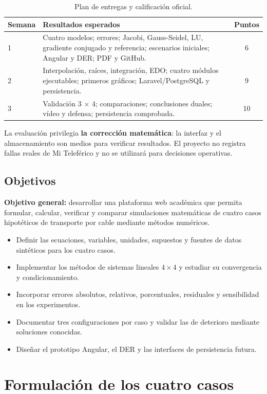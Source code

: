 \documentclass[letterpaper,11pt]{article}
\begin{document}
\begin{table}[H]\centering\small
\caption{Plan de entregas y calificación oficial.}\label{tab:cronograma}
\begin{tabularx}{\linewidth}{@{}lXc@{}}\toprule
\textbf{Semana} & \textbf{Resultados esperados} & \textbf{Puntos}\\\midrule
1 & Cuatro modelos; errores; Jacobi, Gauss-Seidel, LU, gradiente conjugado y referencia; escenarios iniciales; Angular y DER; PDF y GitHub. & 6\\
2 & Interpolación, raíces, integración, EDO; cuatro módulos ejecutables; primeros gráficos; Laravel/PostgreSQL y persistencia. & 9\\
3 & Validación 3 $\times$ 4; comparaciones; conclusiones duales; vídeo y defensa; persistencia comprobada. & 10\\\bottomrule
\end{tabularx}\end{table}
\noindent La evaluación privilegia \textbf{la corrección matemática}: la interfaz y el almacenamiento son medios para verificar resultados. El proyecto no registra fallas reales de Mi Teleférico y no se utilizará para decisiones operativas.

\subsection{Objetivos}
\textbf{Objetivo general:} desarrollar una plataforma web académica que permita formular, calcular, verificar y comparar simulaciones matemáticas de cuatro casos hipotéticos de transporte por cable mediante métodos numéricos.
\begin{itemize}
\item Definir las ecuaciones, variables, unidades, supuestos y fuentes de datos sintéticos para los cuatro casos.
\item Implementar los métodos de sistemas lineales $4\times 4$ y estudiar su convergencia y condicionamiento.
\item Incorporar errores absolutos, relativos, porcentuales, residuales y sensibilidad en los experimentos.
\item Documentar tres configuraciones por caso y validar las de deterioro mediante soluciones conocidas.
\item Diseñar el prototipo Angular, el DER y las interfaces de persistencia futura.
\end{itemize}

\section{Formulación de los cuatro casos}
\end{document}
